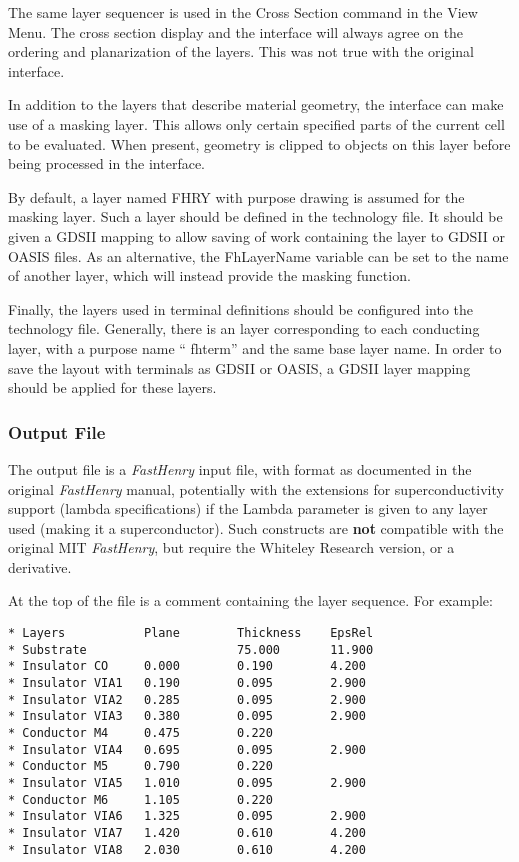 The same layer sequencer is used in the {\cb Cross Section} command in
the {\cb View Menu}.  The cross section display and the interface will
always agree on the ordering and planarization of the layers.  This
was not true with the original interface.

In addition to the layers that describe material geometry, the
interface can make use of a masking layer.  This allows only certain
specified parts of the current cell to be evaluated.  When present,
geometry is clipped to objects on this layer before being processed in
the interface.

By default, a layer named {\vt FHRY} with purpose {\vt drawing} is
assumed for the masking layer.  Such a layer should be defined in the
technology file.  It should be given a GDSII mapping to allow saving
of work containing the layer to GDSII or OASIS files.  As an
alternative, the {\et FhLayerName} variable can be set to the name of
another layer, which will instead provide the masking function.

Finally, the layers used in terminal definitions should be configured
into the technology file.  Generally, there is an {\Xic} layer
corresponding to each conducting layer, with a purpose name ``{\vt
fhterm}'' and the same base layer name.  In order to save the layout
with terminals as GDSII or OASIS, a GDSII layer mapping should be
applied for these layers.

\subsubsection{Output File}

The output file is a {\it FastHenry} input file, with format as
documented in the original {\it FastHenry} manual, potentially with
the extensions for superconductivity support ({\vt lambda}
specifications) if the {\et Lambda} parameter is given to any layer
used (making it a superconductor).  Such constructs are {\bf not}
compatible with the original MIT {\it FastHenry}, but require the
Whiteley Research version, or a derivative.

At the top of the file is a comment containing the layer sequence. 
For example:

\begin{verbatim}
* Layers           Plane        Thickness    EpsRel
* Substrate                     75.000       11.900
* Insulator CO     0.000        0.190        4.200
* Insulator VIA1   0.190        0.095        2.900
* Insulator VIA2   0.285        0.095        2.900
* Insulator VIA3   0.380        0.095        2.900
* Conductor M4     0.475        0.220
* Insulator VIA4   0.695        0.095        2.900
* Conductor M5     0.790        0.220
* Insulator VIA5   1.010        0.095        2.900
* Conductor M6     1.105        0.220
* Insulator VIA6   1.325        0.095        2.900
* Insulator VIA7   1.420        0.610        4.200
* Insulator VIA8   2.030        0.610        4.200
\end{verbatim}

